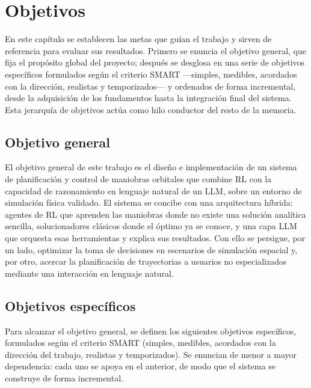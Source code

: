 \chapter{Objetivos}
\label{ch:objetivos}

En este capítulo se establecen las metas que guían el trabajo y sirven de referencia para evaluar sus resultados. Primero se enuncia el objetivo general, que fija el propósito global del proyecto; después se desglosa en una serie de objetivos específicos formulados según el criterio \gls{SMART} ---simples, medibles, acordados con la dirección, realistas y temporizados--- y ordenados de forma incremental, desde la adquisición de los fundamentos hasta la integración final del sistema. Esta jerarquía de objetivos actúa como hilo conductor del resto de la memoria.

\section{Objetivo general}

El objetivo general de este trabajo es el diseño e implementación de un sistema de planificación y control de maniobras orbitales que combine \acrfull{RL} con la capacidad de razonamiento en lenguaje natural de un \gls{LLM}, sobre un entorno de simulación física validado. El sistema se concibe con una arquitectura híbrida: agentes de \gls{RL} que aprenden las maniobras donde no existe una solución analítica sencilla, solucionadores clásicos donde el óptimo ya se conoce, y una capa \gls{LLM}  que orquesta esas herramientas y explica sus resultados. Con ello se persigue, por un lado, optimizar la toma de decisiones en escenarios de simulación espacial y, por otro, acercar la planificación de trayectorias a usuarios no especializados mediante una interacción en lenguaje natural.

\section{Objetivos específicos}

Para alcanzar el objetivo general, se definen los siguientes objetivos específicos, formulados según el criterio \gls{SMART} (simples, medibles, acordados con la dirección del trabajo, realistas y temporizados). Se enuncian de menor a mayor dependencia: cada uno se apoya en el anterior, de modo que el sistema se construye de forma incremental.

